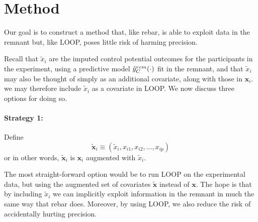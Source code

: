 \section{Method}
Our goal is to construct a method that, like rebar, is able to exploit data in the remnant but, like LOOP, poses little risk of harming precision.

Recall that
$\tilde{x}_{i}$ are the imputed control potential outcomes for the
participants in the experiment, using a predictive model
$\hat{y}_C^{rem}(\cdot)$ fit in the remnant, and that
$\tilde{x}_{i}$ may also be thought of simply as an additional
covariate, along with those in $\mathbf{x}_i$.
we may therefore include $\tilde{x}_{i}$ as a covariate in LOOP.  We now discuss
three options for doing so.




\paragraph{Strategy 1:}
Define
\begin{equation}
\tilde{\mathbf{x}}_i \equiv (\tilde{x}_{i}, x_{i1}, x_{i2}, ..., x_{ip})
\end{equation}
or in other words, $\tilde{\mathbf{x}}_i$ is $\mathbf{x}_i$ augmented with $\tilde{x}_i$.

The most straight-forward option would be to run LOOP on the experimental data, but using the augmented set of covariates $\tilde{\mathbf{x}}$ instead of $\mathbf{x}$.  The hope is that by including $\tilde{x}_{i}$ we can implicitly exploit information in the remnant in much the same way that rebar does.  Moreover, by using LOOP, we also reduce the risk of accidentally hurting precision.

